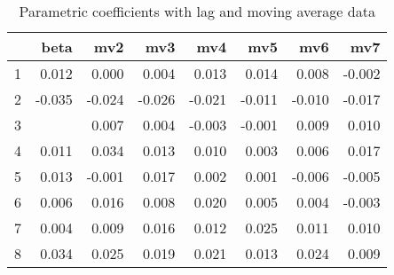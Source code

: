 \documentclass[a4paper, 12pt]{article}
\begin{document}
\begin{table}[h]
\centering
\caption{Parametric coefficients with lag and moving average data}
\begin{tabular}{rrrrrrrr}
  \hline
 & beta & mv2 & mv3 & mv4 & mv5 & mv6 & mv7 \\
  \hline
1 & 0.012 & 0.000 & 0.004 & 0.013 & 0.014 & 0.008 & -0.002 \\
  2 & -0.035 & -0.024 & -0.026 & -0.021 & -0.011 & -0.010 & -0.017 \\
  3 & \color{red}{0.036} & 0.007 & 0.004 & -0.003 & -0.001 & 0.009 & 0.010 \\
  4 & 0.011 & 0.034 & 0.013 & 0.010 & 0.003 & 0.006 & 0.017 \\
  5 & 0.013 & -0.001 & 0.017 & 0.002 & 0.001 & -0.006 & -0.005 \\
  6 & 0.006 & 0.016 & 0.008 & 0.020 & 0.005 & 0.004 & -0.003 \\
  7 & 0.004 & 0.009 & 0.016 & 0.012 & 0.025 & 0.011 & 0.010 \\
  8 & 0.034 & 0.025 & 0.019 & 0.021 & 0.013 & 0.024 & 0.009 \\
   \hline
\end{tabular}
\end{table}
\clearpage
\end{document}
